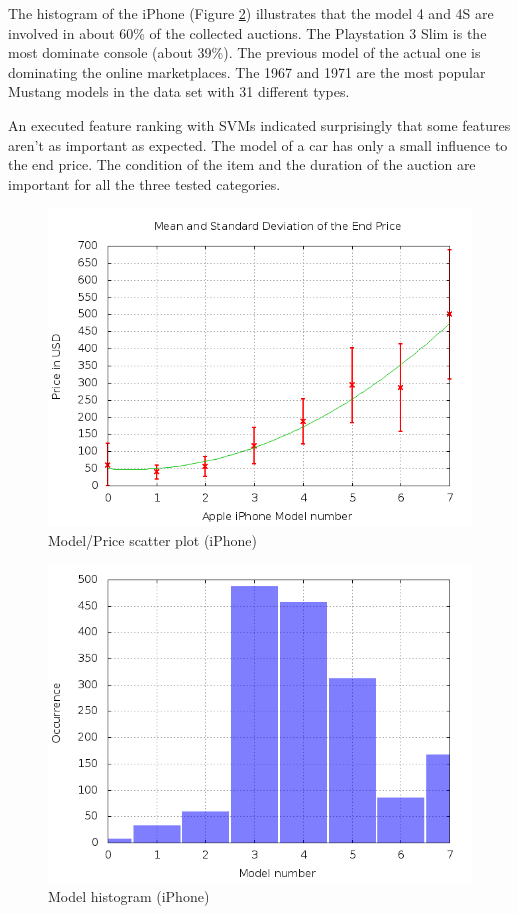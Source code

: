 The histogram of the iPhone (Figure \ref{model_hist_iphone}) illustrates that the model 4 and 4S are involved in about 60\% of the collected auctions. The Playstation 3 Slim is the most dominate console (about 39\%). The previous model of the actual one is dominating the online marketplaces. The 1967 and 1971 are the most popular Mustang models in the data set with 31 different types.

An executed feature ranking \cite{guyon} with SVMs indicated surprisingly that some features aren't as important as expected. The model of a car has only a small influence to the end price. The condition of the item and the duration of the auction are important for all the three tested categories.
\begin{figure}
\centering
\includegraphics[scale=0.5]{images/plots/iphone/price_model_iphone.png}
\caption{Model/Price scatter plot (iPhone)}
\label{model_price_iphone}
\end{figure}
\begin{figure}
\centering
\includegraphics[scale=0.5]{images/plots/iphone/hist_model_iphone.png}
\caption{Model histogram (iPhone)}
\label{model_hist_iphone}
\end{figure}

